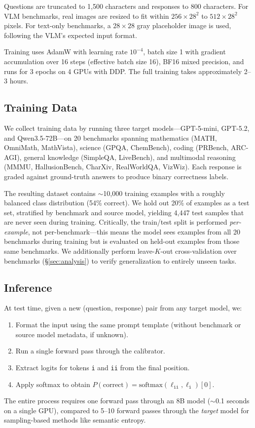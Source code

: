 \documentclass{colm2026}
\begin{document}
Questions are truncated to 1,500 characters and responses to 800 characters. For VLM benchmarks, real images are resized to fit within $256 \times 28^2$ to $512 \times 28^2$ pixels. For text-only benchmarks, a $28 \times 28$ gray placeholder image is used, following the VLM's expected input format.

Training uses AdamW with learning rate $10^{-4}$, batch size 1 with gradient accumulation over 16 steps (effective batch size 16), BF16 mixed precision, and runs for 3 epochs on 4 GPUs with DDP. The full training takes approximately 2--3 hours.

\subsection{Training Data}

We collect training data by running three target models---GPT-5-mini, GPT-5.2, and Qwen3.5-72B---on 20 benchmarks spanning mathematics (MATH, OmniMath, MathVista), science (GPQA, ChemBench), coding (PRBench, ARC-AGI), general knowledge (SimpleQA, LiveBench), and multimodal reasoning (MMMU, HallusionBench, CharXiv, RealWorldQA, VizWiz). Each response is graded against ground-truth answers to produce binary correctness labels.

The resulting dataset contains ${\sim}$10,000 training examples with a roughly balanced class distribution (54\% correct). We hold out 20\% of examples as a test set, stratified by benchmark and source model, yielding 4,447 test samples that are never seen during training. Critically, the train/test split is performed \emph{per-example}, not per-benchmark---this means the model sees examples from all 20 benchmarks during training but is evaluated on held-out examples from those same benchmarks. We additionally perform leave-$K$-out cross-validation over benchmarks (\S\ref{sec:analysis}) to verify generalization to entirely unseen tasks.

\subsection{Inference}

At test time, given a new (question, response) pair from any target model, we:
\begin{enumerate}
    \item Format the input using the same prompt template (without benchmark or source model metadata, if unknown).
    \item Run a single forward pass through the calibrator.
    \item Extract logits for tokens \texttt{i} and \texttt{ii} from the final position.
    \item Apply softmax to obtain $P(\text{correct}) = \text{softmax}(\ell_\texttt{ii}, \ell_\texttt{i})[0]$.
\end{enumerate}
The entire process requires one forward pass through an 8B model (${\sim}$0.1 seconds on a single GPU), compared to 5--10 forward passes through the \emph{target} model for sampling-based methods like semantic entropy.
\end{document}
